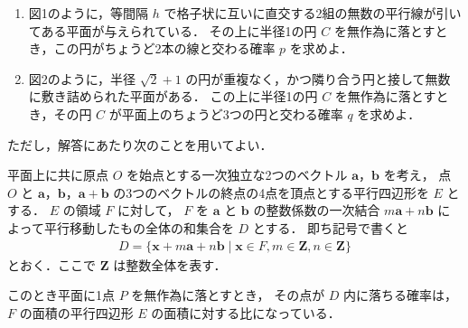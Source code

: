 \documentclass[../../main.tex]{subfiles}
\begin{document}
\begin{enumerate}
  \item 図1のように，等間隔 $h$ で格子状に互いに直交する2組の無数の平行線が引いてある平面が与えられている．
    その上に半径1の円 $C$ を無作為に落とすとき，この円がちょうど2本の線と交わる確率 $p$ を求めよ．
  \item 図2のように，半径 $\sqrt2+1$ の円が重複なく，かつ隣り合う円と接して無数に敷き詰められた平面がある．
    この上に半径1の円 $C$ を無作為に落とすとき，その円 $C$ が平面上のちょうど3つの円と交わる確率 $q$ を求めよ．
\end{enumerate}

ただし，解答にあたり次のことを用いてよい．

平面上に共に原点 $O$ を始点とする一次独立な2つのベクトル $\bm{a}$，$\bm{b}$ を考え，
点 $O$ と $\bm{a}$，$\bm{b}$，$\bm{a+b}$ の3つのベクトルの終点の4点を頂点とする平行四辺形を $E$ とする．
$E$ の領域 $F$ に対して，
$F$ を $\bm{a}$ と $\bm{b}$ の整数係数の一次結合 $m\bm{a}+n\bm{b}$ によって平行移動したもの全体の和集合を $D$ とする．
即ち記号で書くと
\begin{align*}
  D=\{ \bm{x}+m\bm{a}+n\bm{b} \mid \bm{x}\in F, m\in\mathbf{Z}, n\in\mathbf{Z} \}
\end{align*}
とおく．ここで $\mathbf{Z}$ は整数全体を表す．

このとき平面に1点 $P$ を無作為に落とすとき，
その点が $D$ 内に落ちる確率は，
$F$ の面積の平行四辺形 $E$ の面積に対する比になっている．

\begin{figure}[htbp]
  \centering
  \hspace{2cm}
\end{figure}
\end{document}
